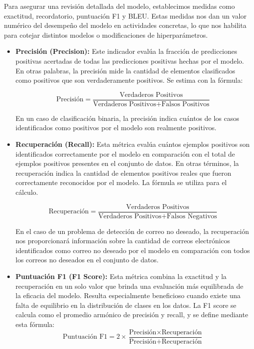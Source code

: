 Para asegurar una revisión detallada del modelo, establecimos medidas como exactitud, recordatorio, puntuación F1 y \acrshort{BLEU}. Estas medidas nos dan un valor numérico del desempeño del modelo en actividades concretas, lo que nos habilita para cotejar distintos modelos o modificaciones de hiperparámetros.

\begin{itemize}

\item\textbf{Precisión (Precision):} Este indicador evalúa la fracción de predicciones positivas acertadas de todas las predicciones positivas hechas por el modelo. En otras palabras, la precisión mide la cantidad de elementos clasificados como positivos que son verdaderamente positivos. Se estima con la fórmula:
    
\[
\text{Precisión} = \frac{\text{Verdaderos Positivos}}{\text{Verdaderos Positivos} + \text{Falsos Positivos}}
\]

    En un caso de clasificación binaria, la precisión indica cuántos de los casos identificados como positivos por el modelo son realmente positivos.

    \bigskip %

\item \textbf{Recuperación (Recall):} Esta métrica evalúa cuántos ejemplos positivos son identificados correctamente por el modelo en comparación con el total de ejemplos positivos presentes en el conjunto de datos. En otras términos, la recuperación indica la cantidad de elementos positivos reales que fueron correctamente reconocidos por el modelo. La fórmula se utiliza para el cálculo.
    
\[
\text{Recuperación} = \frac{\text{Verdaderos Positivos}}{\text{Verdaderos Positivos} + \text{Falsos Negativos}}
\]
    
En el caso de un problema de detección de correo no deseado, la recuperación nos proporcionará información sobre la cantidad de correos electrónicos identificados como correo no deseado por el modelo en comparación con todos los correos no deseados en el conjunto de datos.

\bigskip %
    
\item \textbf{Puntuación F1 (F1 Score):} Esta métrica combina la exactitud y la recuperación en un solo valor que brinda una evaluación más equilibrada de la eficacia del modelo. Resulta especialmente beneficioso cuando existe una falta de equilibrio en la distribución de clases en los datos. La F1 score se calcula como el promedio armónico de precisión y recall, y se define mediante esta fórmula:
\[
\text{Puntuación F1} = 2 \times \frac{\text{Precisión} \times \text{Recuperación}}{\text{Precisión} + \text{Recuperación}}
\]


\end{itemize}
